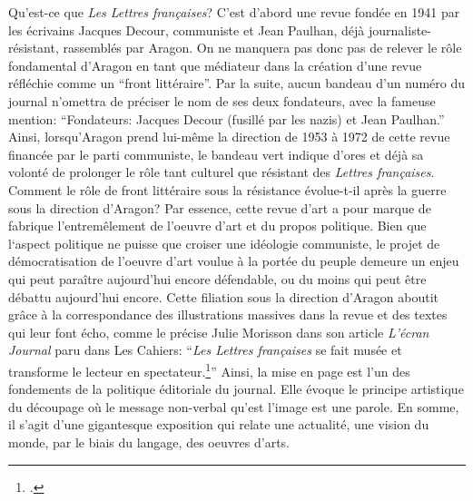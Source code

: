 Qu'est-ce que \emph{Les Lettres françaises}? C'est d'abord une revue fondée en 1941 par les écrivains Jacques Decour, communiste et Jean Paulhan, déjà journaliste-résistant, rassemblés par Aragon. On ne manquera pas donc pas de relever le rôle fondamental d'Aragon en tant que médiateur dans la création d'une revue réfléchie comme un \enquote{front littéraire}. Par la suite, aucun bandeau d'un numéro du journal n'omettra de préciser le nom de ses deux fondateurs, avec la fameuse mention: \enquote{Fondateurs: Jacques Decour (fusillé par les nazis) et Jean Paulhan.} Ainsi, lorsqu'Aragon prend lui-même la direction de 1953 à 1972 de cette revue financée par le parti communiste, le bandeau vert indique d'ores et déjà sa volonté de prolonger le rôle tant culturel que résistant des \emph{Lettres françaises}. Comment le rôle de front littéraire sous la résistance évolue-t-il après la guerre sous la direction d'Aragon? Par essence, cette revue d'art a pour marque de fabrique l'entremêlement de l'oeuvre d'art et du propos politique. Bien que l‘aspect politique ne puisse que croiser une idéologie communiste, le projet de démocratisation de l'oeuvre d'art voulue à la portée du peuple demeure un enjeu qui peut paraître aujourd'hui encore défendable, ou du moins qui peut être débattu aujourd'hui encore. Cette filiation sous la direction d'Aragon aboutit grâce à la correspondance des illustrations massives dans la revue et des textes qui leur font écho, comme le précise Julie Morisson dans son article \emph{L'écran Journal} paru dans Les Cahiers: \enquote{\emph{Les Lettres françaises} se fait musée et transforme le lecteur en spectateur.\footcite[p. 169--172]{cahiers}} Ainsi, la mise en page est l'un des fondements de la politique éditoriale du journal. Elle évoque le principe artistique du découpage où le message non-verbal qu'est l'image est une parole. En somme, il s'agit d'une gigantesque exposition qui relate une actualité, une vision du monde, par le biais du langage, des oeuvres d'arts.

